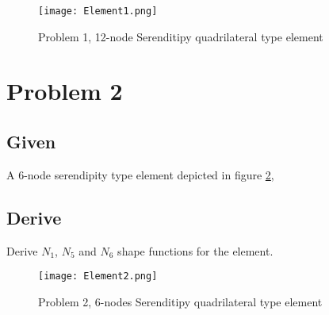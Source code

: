 \documentclass[a4paper]{memoir}
\begin{document}
\begin{figure}
	\centering
		\texttt{[image: Element1.png]}
	\caption{Problem 1, 12-node Serenditipy quadrilateral type element}
	\label{fig:element1}
\end{figure}




\section{Problem 2}
\subsection{Given}
A 6-node serendipity type element depicted in figure \ref{fig:element2},

\subsection{Derive}
Derive $N_1$, $N_5$ and $N_6$ shape functions for the element.

\begin{figure}
	\centering
		\texttt{[image: Element2.png]}
	\caption{Problem 2, 6-nodes Serenditipy quadrilateral type element}
	\label{fig:element2}
\end{figure}



\end{document}
